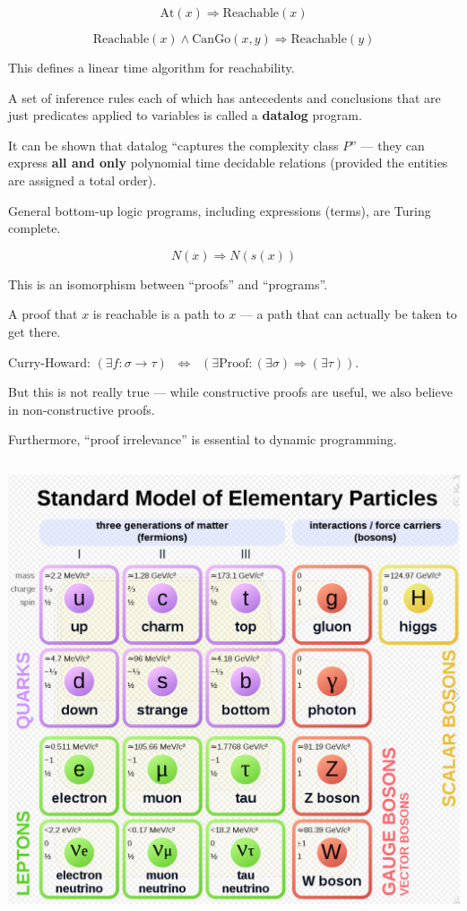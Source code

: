 {\vfill
$$\mathrm{At}(x) \Rightarrow \mathrm{Reachable}(x)$$

\vfill
$$\mathrm{Reachable}(x) \wedge \mathrm{CanGo}(x,y) \Rightarrow \mathrm{Reachable}(y)$$

\vfill
This defines a linear time algorithm for reachability.


A set of inference rules each of which has antecedents and conclusions that are just predicates applied to variables is called a {\bf datalog} program.

\vfill
It can be shown that datalog ``captures the complexity class $P$'' --- they can express {\bf all and only} polynomial time decidable relations
(provided the entities are assigned a total order).

\vfill
General bottom-up logic programs, including expressions (terms), are Turing complete.

$$N(x) \Rightarrow N(s(x))$$


This is an isomorphism between ``proofs'' and ``programs''.

\vfill
A proof that $x$ is reachable is a path to $x$ --- a path that can actually be taken to get there.

\vfill
Curry-Howard: $\left(\exists f:\sigma \rightarrow \tau\right) \;\;\Leftrightarrow \;\;\left(\exists \mathrm{Proof}: (\exists \sigma) \Rightarrow (\exists \tau)\right)$.

\vfill
But this is not really true --- while constructive proofs are useful, we also believe in non-constructive proofs.

\vfill
Furthermore, ``proof irrelevance'' is essential to dynamic programming.


\centerline{\includegraphics[height = 5.3in]{../images/StandardModel}}

}
